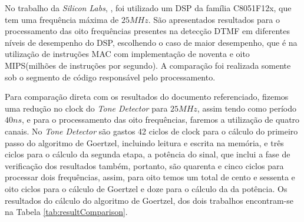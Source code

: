 \documentclass[monografia]{subfiles}
\begin{document}
			No trabalho da \textit{Silicon Labs}, \cite{siliconLabs1}, foi utilizado um DSP da família C8051F12x, que tem uma frequência máxima de $25 MHz$. 
			São apresentados resultados para o processamento das oito frequências presentes na detecção DTMF
			em diferentes níveis de desempenho do DSP, escolhendo o caso de maior desempenho, que é na utilização de instruções MAC com implementação de 
			noventa e oito MIPS(milhões de instruções por segundo). A comparação foi realizada 
			somente sob o segmento de código responsável pelo processamento.


			Para comparação direta com os resultados do documento referenciado, fizemos uma redução no clock do \textit{Tone Detector} para $25 MHz$, assim tendo
			como período $40 ns$, e para o processamento das oito frequências, faremos a utilização de quatro canais. 
			No \textit{Tone Detector} são gastos 42 ciclos de clock para o cálculo do primeiro passo
			do algoritmo de Goertzel, incluindo leitura e escrita na memória, e três ciclos
			para o cálculo da segunda etapa, a potência do sinal, que inclui a fase de verificação dos resultados também, portanto, são 
			quarenta e cinco ciclos
			para processar dois frequências, assim, para oito temos um total de cento e sessenta e oito ciclos para o cálculo de Goertzel e 
			doze para o cálculo da da potência. 
			Os resultados do cálculo do algoritmo de Goertzel, dos dois trabalhos encontram-se na Tabela \ref{tab:resultComparison}.		
\end{document}
